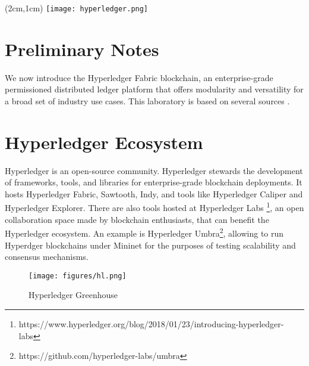 \documentclass[12pt,a4paper]{article}
\theoremstyle{definition}
\begin{document}
\textblockorigin{-34pt}{-12pt}
\begin{textblock*}{10cm}(2cm,1cm)
\texttt{[image: hyperledger.png]}
\end{textblock*}
\newtheorem{mydef}{Definition}

\section*{Preliminary Notes}
We now introduce the Hyperledger Fabric blockchain, an enterprise-grade permissioned distributed ledger platform that offers modularity and versatility for a broad set of industry use cases.
This laboratory is based on several sources \cite{belchior2019_thesis, fabric}.






\section{ Hyperledger Ecosystem}
Hyperledger is an open-source community. Hyperledger stewards the development of frameworks, tools, and libraries for enterprise-grade blockchain deployments.
It hosts Hyperledger Fabric, Sawtooth, Indy, and tools like Hyperledger Caliper and Hyperledger Explorer. There are also tools hosted at Hyperledger Labs \footnote{https://www.hyperledger.org/blog/2018/01/23/introducing-hyperledger-labs}, an open collaboration space made by blockchain enthusiasts, that can benefit the Hyperledger ecosystem. An example is Hyperledger Umbra\footnote{https://github.com/hyperledger-labs/umbra}, allowing to run Hyperdger blockchains under Mininet for the purposes of testing scalability and consensus mechanisms.


\begin{figure}[h]

\texttt{[image: figures/hl.png]}
\centering
\caption{Hyperledger Greenhouse}
\label{fig:hl}
\end{figure}
\end{document}
